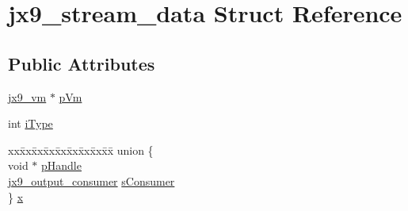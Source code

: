 \hypertarget{structjx9__stream__data}{\section{jx9\-\_\-stream\-\_\-data Struct Reference}
\label{d0/df3/structjx9__stream__data}
}
\subsection*{Public Attributes}
\begin{DoxyCompactItemize}
\item 
\hyperlink{structjx9__vm}{jx9\-\_\-vm} $\ast$ \hyperlink{structjx9__stream__data_a8318805380a33e5b75027b98e5baadbb}{p\-Vm}
\item 
int \hyperlink{structjx9__stream__data_ac49e5d1107b6f543ac74c895535b5624}{i\-Type}
\item 
\begin{tabbing}
xx\=xx\=xx\=xx\=xx\=xx\=xx\=xx\=xx\=\kill
union \{\\
\>void $\ast$ \hyperlink{structjx9__stream__data_a12ce65cc5f443551bb6b005f985896ba}{pHandle}\\
\>\hyperlink{structjx9__output__consumer}{jx9\_output\_consumer} \hyperlink{structjx9__stream__data_a56682842fd5931f437036c616b4c9350}{sConsumer}\\
\} \hyperlink{structjx9__stream__data_ab5237e1607c2925675cdc0cb869ac0fe}{x}\\

\end{tabbing}\end{DoxyCompactItemize}


